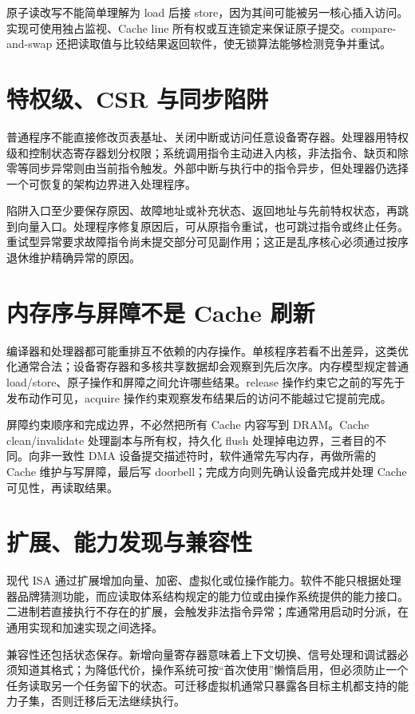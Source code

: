 原子读改写不能简单理解为 load 后接 store，因为其间可能被另一核心插入访问。实现可使用独占监视、Cache line 所有权或互连锁定来保证原子提交。compare-and-swap 还把读取值与比较结果返回软件，使无锁算法能够检测竞争并重试。

\section{特权级、CSR 与同步陷阱}

普通程序不能直接修改页表基址、关闭中断或访问任意设备寄存器。处理器用特权级和控制状态寄存器划分权限；系统调用指令主动进入内核，非法指令、缺页和除零等同步异常则由当前指令触发。外部中断与执行中的指令异步，但处理器仍选择一个可恢复的架构边界进入处理程序。

陷阱入口至少要保存原因、故障地址或补充状态、返回地址与先前特权状态，再跳到向量入口。处理程序修复原因后，可从原指令重试，也可跳过指令或终止任务。重试型异常要求故障指令尚未提交部分可见副作用；这正是乱序核心必须通过按序退休维护精确异常的原因。

\section{内存序与屏障不是 Cache 刷新}

编译器和处理器都可能重排互不依赖的内存操作。单核程序若看不出差异，这类优化通常合法；设备寄存器和多核共享数据却会观察到先后次序。内存模型规定普通 load/store、原子操作和屏障之间允许哪些结果。release 操作约束它之前的写先于发布动作可见，acquire 操作约束观察发布结果后的访问不能越过它提前完成。

屏障约束顺序和完成边界，不必然把所有 Cache 内容写到 DRAM。Cache clean/invalidate 处理副本与所有权，持久化 flush 处理掉电边界，三者目的不同。向非一致性 DMA 设备提交描述符时，软件通常先写内存，再做所需的 Cache 维护与写屏障，最后写 doorbell；完成方向则先确认设备完成并处理 Cache 可见性，再读取结果。

\section{扩展、能力发现与兼容性}

现代 ISA 通过扩展增加向量、加密、虚拟化或位操作能力。软件不能只根据处理器品牌猜测功能，而应读取体系结构规定的能力位或由操作系统提供的能力接口。二进制若直接执行不存在的扩展，会触发非法指令异常；库通常用启动时分派，在通用实现和加速实现之间选择。

兼容性还包括状态保存。新增向量寄存器意味着上下文切换、信号处理和调试器必须知道其格式；为降低代价，操作系统可按“首次使用”懒惰启用，但必须防止一个任务读取另一个任务留下的状态。可迁移虚拟机通常只暴露各目标主机都支持的能力子集，否则迁移后无法继续执行。

